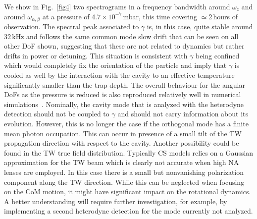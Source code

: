 \documentclass[aps,pra,twocolumn,nopacs,superscriptaddress,groupedaddress]{revtex4}
\begin{document}
We show in Fig.~\ref{fig4} two spectrograms in a frequency bandwidth around $\omega_z$ and around $\omega_{\alpha,\beta}$ at a pressure of $4.7\times10^{-7}$\,mbar, this time covering $\simeq2$\,hours of observation. The spectral peak associated to $\gamma$ is, in this case, quite stable around $32$\,kHz and follows the same common mode slow drift that can be seen on all other DoF shown, suggesting that these are not related to dynamics but rather drifts in power or detuning. This situation is consistent with $\gamma$ being confined which would completely fix the orientation of the particle and imply that $\gamma$ is cooled as well by the interaction with the cavity to an effective temperature significantly smaller than the trap depth. The overall behaviour for the angular DoFs as the pressure is reduced is also reproduced relatively well in numerical simulations~\cite{supp}.  Nominally, the cavity mode that is analyzed with the heterodyne detection should not be coupled to $\gamma$ and should not carry information about its evolution. However, this is no longer the case if the orthogonal mode has a finite mean photon occupation. This can occur in presence of a small tilt of the TW propagation direction with respect to the cavity. Another possibility could be found in the TW true field distribution. Typically CS models relies on a Gaussian approximation for the TW beam which is clearly not accurate when high NA lenses are employed. In this case there is a small but nonvanishing polarization component along the TW direction. While this can be neglected when focusing on the CoM motion, it might have significant impact on the rotational dynamics. A better understanding will require further investigation, for example, by implementing a second heterodyne detection for the mode currently not analyzed.




\end{document}
